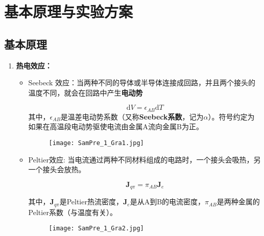 \documentclass[dvipsnames, svgnames,a4paper,11pt]{article}
\begin{document}
\section{基本原理与实验方案}
    
    
    \subsection{基本原理}

        \begin{enumerate}
            \item \textbf{热电效应：}
            
                \begin{itemize}
                    \item Seebeck 效应：当两种不同的导体或半导体连接成回路，并且两个接头的温度不同，就会在回路中产生\textbf{电动势}
                    
                        \[
                            \mathrm{d}V=\epsilon_{AB}\mathrm{d}T
                        \]
                        其中，$\epsilon_{AB}$是温差电动势系数（又称\textbf{Seebeck系数}，记为$\alpha$）。符号约定为如果在高温段电动势驱使电流由金属A流向金属B为正。
        
                        \begin{figure}[htbp]
                            \centering
                            \texttt{[image: SamPre\_1\_Gra1.jpg]}
                        \end{figure}
        
                    \item Peltier效应: 当电流通过两种不同材料组成的电路时，一个接头会吸热，另一个接头会放热。
                    
                        \[
                            \textbf{J}_{q\pi}=\pi_{AB}\textbf{J}_{e}
                        \]
        
                        其中，$\textbf{J}_{q\pi}$是Peltier热流密度，$\textbf{J}_{e}$是从A到B的电流密度，$\pi_{AB}$是两种金属的Peltier系数（与温度有关）。
        
                        \begin{figure}[htbp]
                            \centering
                            \texttt{[image: SamPre\_1\_Gra2.jpg]}
                        \end{figure}
        
        
                    

\end{itemize}
\end{enumerate}
\end{document}
